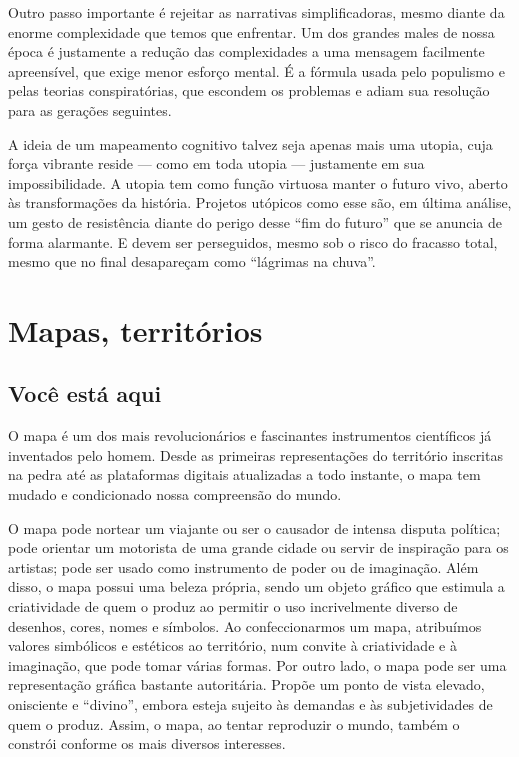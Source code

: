 Outro passo importante é rejeitar as narrativas simplificadoras, mesmo diante da enorme complexidade que temos que enfrentar. Um dos grandes males de nossa época é justamente a redução das complexidades a uma mensagem facilmente apreensível, que exige menor esforço mental. É a fórmula usada pelo populismo e pelas teorias conspiratórias, que escondem os problemas e adiam sua resolução para as gerações seguintes. 

A ideia de um mapeamento cognitivo talvez seja apenas mais uma utopia,
cuja força vibrante reside --- como em toda utopia --- justamente em sua
impossibilidade. A utopia tem como função virtuosa manter o futuro vivo,
aberto às transformações da história. Projetos utópicos como esse
são, em última análise, um gesto de resistência
diante do perigo desse ``fim do futuro'' que se anuncia de forma
alarmante. E devem ser perseguidos, mesmo sob o risco
do fracasso total, mesmo que no final desapareçam como ``lágrimas na
chuva''.


\part{Mapas, territórios}

\chapter{Você está aqui}

O mapa é um dos mais revolucionários e fascinantes instrumentos
científicos já inventados pelo homem. Desde as primeiras representações
do território inscritas na pedra até as plataformas digitais atualizadas
a todo instante, o mapa tem mudado e condicionado nossa compreensão do
mundo.

O mapa pode nortear um viajante ou ser o causador de intensa disputa
política; pode orientar um motorista de uma grande cidade ou servir de
inspiração para os artistas; pode ser usado como instrumento de poder ou
de imaginação. Além disso, o mapa possui uma beleza própria, sendo um
objeto gráfico que estimula a criatividade de quem o produz ao permitir
o uso incrivelmente diverso de desenhos, cores, nomes e símbolos. Ao
confeccionarmos um mapa, atribuímos valores simbólicos e estéticos ao
território, num convite à criatividade e à imaginação, que pode tomar
várias formas. Por outro lado, o mapa pode ser uma representação gráfica
bastante autoritária. Propõe um ponto de vista elevado, onisciente e
``divino'', embora esteja sujeito às demandas e às subjetividades de
quem o produz. Assim, o mapa, ao tentar reproduzir o mundo, também o
constrói conforme os mais diversos interesses.

